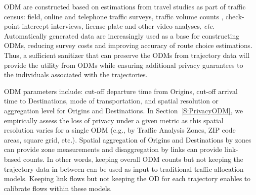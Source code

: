 \documentclass[times,twocolumn,final,authoryear]{elsarticle}
\begin{document}
\begin{table}[]
\caption{An Origin Destination Matrix from a spatial interaction survey}
\centering

\label{table:ODMeg} 
\end{table}

ODM are constructed based on estimations from travel studies as part of traffic census: field, online and telephone traffic surveys, traffic volume counts \citep{robillard1975}, check-point intercept interviews, license plate and other video analyses, {\it etc}.  
Automatically generated data \citep[e.g. CDR]{iqbal2014} are increasingly used as a base for constructing ODMs, reducing survey costs and improving accuracy of route choice estimations. 
Thus, a sufficient sanitizer that can preserve the ODMs from trajectory data will provide the utility from ODMs while ensuring additional privacy guarantees to the individuals associated with the trajectories. 

ODM parameters include: cut-off departure time from Origins, cut-off arrival time to Destinations, mode of transportation, and spatial resolution or aggregation level for Origins and Destinations. 
In Section~\ref{S:PrivacyODM}, we empirically assess the loss of privacy under a given metric as this spatial resolution varies for a single ODM (e.g., by Traffic Analysis Zones, ZIP code areas, square grid, etc.). Spatial aggregation of Origins and Destinations by zones can provide zone measurements and disaggregation by links can provide link-based counts. 
In other words, keeping overall ODM counts but not keeping the trajectory data in between can be used as input to traditional traffic allocation models. Keeping link flows but not keeping the OD for each trajectory enables to calibrate flows within these models.
\end{document}
